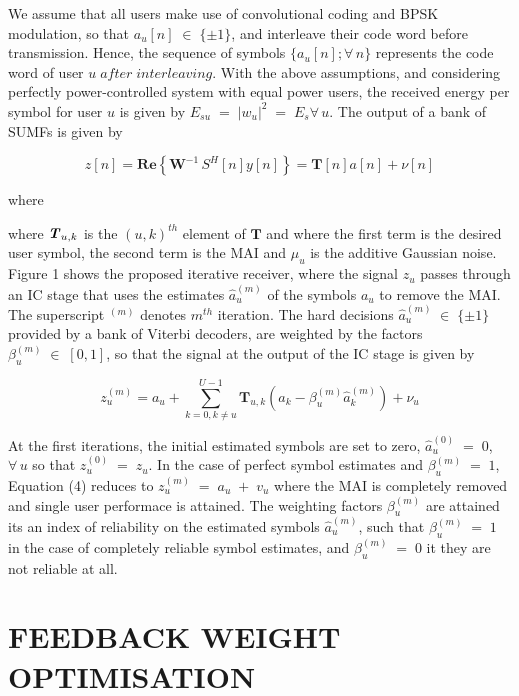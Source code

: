\documentclass[a4paper,10pt]{article}
\begin{document}
We assume that all users make use of convolutional coding and BPSK modulation, so that $a_u[n]\;\in\;\{\pm 1\}$, and interleave their code word before transmission. Hence, the sequence of symbols $\{a_u[n];\forall\,n\}$ represents the code word of user $u\;after\; interleaving$. With the above assumptions, and considering perfectly power-controlled system with equal power users, the received energy per symbol for user $u$ is given by $E_{su}\;=\;\vert w_u \vert ^2\;=\;E_s \forall\,u$. The output of a bank of SUMFs is given by

\begin{equation}
z[n]= \mathbf{Re}\left\{\mathbf{W}^{-1}\,S^H[n]y[n]\right\} = \mathbf{T}[n]a[n]+\nu [n]
\end{equation}

where 

where $\textbf{\textit{T}}_{u,k}$ is the $(u,k)^{th}$ element of $\textbf{T}$ and where the first term is the desired user symbol, the second term is the MAI and $\mu_u$ is the additive Gaussian noise. Figure 1 shows the proposed iterative receiver, where the signal $z_u$ passes through an IC stage that uses the estimates $\hat{a}_u^{(m)}$ of the symbols $a_u$ to remove the MAI. The superscript $^{(m)}$ denotes $m^{th}$ iteration. The hard decisions $\hat{a}_u^{(m)}\;\in\;\{\pm 1\}$ provided by a bank of Viterbi decoders, are weighted by the factors $\beta_u^{(m)}\;\in\;[0,1]$, so that the signal at the output of the IC stage is given by

\begin{equation}
z_u^{(m)}=a_u+\sum\limits_{k=0,k\neq u}^{U-1} \mathbf{T}_{u,k}\left ( a_k- \beta_u^{(m)}\hat{a}_k^{(m)}\right ) + \nu_u
\end{equation}

At the first iterations, the initial estimated symbols are set to zero, $\hat{a}_u^{(0)}\;=\;0$, $\forall\,u$ so that $z_u^{(0)}\;=\;z_u$. In the case of perfect symbol estimates and $\beta_u^{(m)}\;=\;1$, Equation (4) reduces to $z_u^{(m)}\;=\;a_u\;+\;v_u$ where the MAI is completely removed and single user performace is attained. The weighting factors $\beta_u^{(m)}$ are attained its an index of reliability on the estimated symbols $\hat{a}_u^{(m)}$, such that $\beta_u^{(m)}\;=\;1$ in the case of completely reliable symbol estimates, and $\beta_u^{(m)}\;=\;0$ it they are not reliable at all.

\section{FEEDBACK WEIGHT OPTIMISATION}
\end{document}
